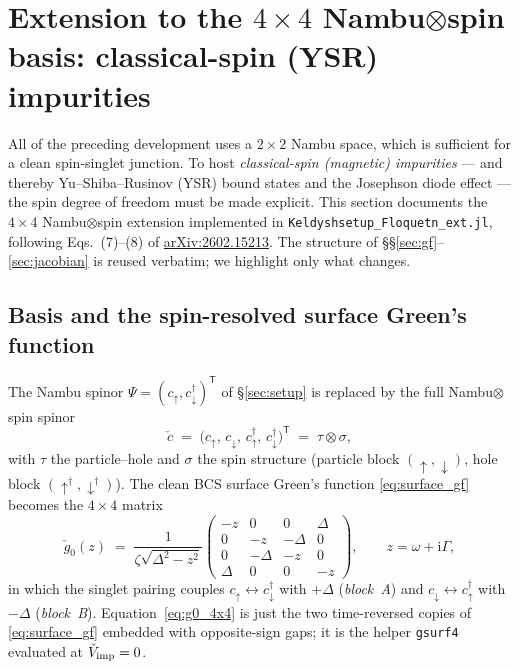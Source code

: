 \documentclass[11pt,a4paper]{article}
\newcommand{\ii}{\mathrm{i}}
\begin{document}
\section{Extension to the \texorpdfstring{$4\times4$}{4x4} Nambu\texorpdfstring{$\otimes$}{x}spin basis: classical-spin (YSR) impurities}
\label{sec:ysr}

All of the preceding development uses a $2\times2$ Nambu space, which is
sufficient for a clean spin-singlet junction.  To host \emph{classical-spin
(magnetic) impurities} --- and thereby Yu--Shiba--Rusinov (YSR) bound states and
the Josephson diode effect --- the spin degree of freedom must be made explicit.
This section documents the $4\times4$ Nambu$\otimes$spin extension implemented in
\texttt{Keldyshsetup\_Floquetn\_ext.jl}, following Eqs.~(7)--(8) of
\href{https://arxiv.org/abs/2602.15213}{arXiv:2602.15213}.  The structure of
\S\S\ref{sec:gf}--\ref{sec:jacobian} is reused verbatim; we highlight only what
changes.

\subsection{Basis and the spin-resolved surface Green's function}
\label{sec:ysr_basis}

The Nambu spinor $\Psi=(c_\uparrow,c^\dagger_\downarrow)^{\mathsf T}$ of
\S\ref{sec:setup} is replaced by the full Nambu$\otimes$spin spinor
\begin{equation}
  \check c \;=\; \big(c_\uparrow,\,c_\downarrow,\,c^\dagger_\uparrow,\,c^\dagger_\downarrow\big)^{\mathsf T}
  \;=\;\tau\otimes\sigma,
\end{equation}
with $\tau$ the particle--hole and $\sigma$ the spin structure (particle block
$(\uparrow,\downarrow)$, hole block $(\uparrow^\dagger,\downarrow^\dagger)$).  The
clean BCS surface Green's function \eqref{eq:surface_gf} becomes the $4\times4$
matrix
\begin{equation}
  \check g_0(z) \;=\; \frac{1}{\zeta\sqrt{\Delta^2-z^2}}
  \begin{pmatrix}
    -z & 0 & 0 & \Delta\\
    0 & -z & -\Delta & 0\\
    0 & -\Delta & -z & 0\\
    \Delta & 0 & 0 & -z
  \end{pmatrix},
  \qquad z=\omega+\ii\Gamma,
  \label{eq:g0_4x4}
\end{equation}
in which the singlet pairing couples $c_\uparrow\!\leftrightarrow\!c^\dagger_\downarrow$
with $+\Delta$ (\emph{block~A}) and $c_\downarrow\!\leftrightarrow\!c^\dagger_\uparrow$
with $-\Delta$ (\emph{block~B}).  Equation~\eqref{eq:g0_4x4} is just the two
time-reversed copies of \eqref{eq:surface_gf} embedded with opposite-sign gaps;
it is the helper \texttt{gsurf4} evaluated at $\check V_{\rm imp}=0$.
\end{document}
